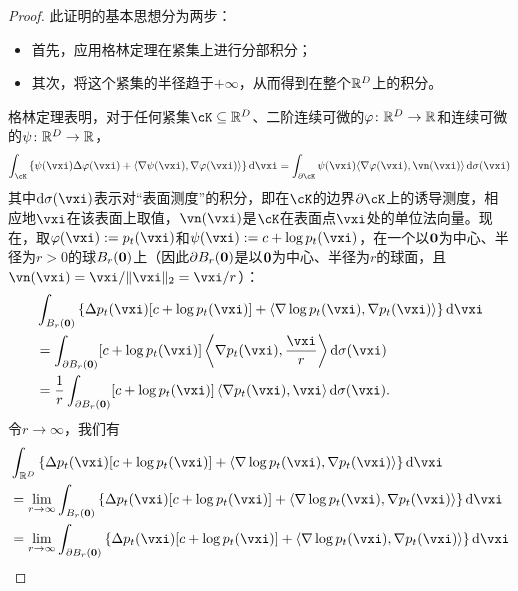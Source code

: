 \documentclass[../../book-main.tex]{subfiles}
\begin{document}
\begin{proof}
    此证明的基本思想分为两步：
    \begin{itemize}
        \item 首先，应用格林定理在紧集上进行分部积分；
        \item 其次，将这个紧集的半径趋于\(+\infty\)，从而得到在整个\(\mathbb{R}^{D}\)上的积分。
    \end{itemize}
    格林定理表明，对于任何紧集\(\cK \subseteq \R^{D}\)、二阶连续可微的\(\plainphi \colon \R^{D} \to \R\)和连续可微的\(\psi \colon \mathbb{R}^{D} \to \mathbb{R}\)，
    \begin{equation}
        \int_{\cK}\bc{\psi(\vxi) \Delta \plainphi(\vxi) + \ip{\nabla \psi(\vxi)}{\nabla \plainphi(\vxi)}}\odif{\vxi} = \int_{\partial \cK}\psi(\vxi)\ip{\nabla \plainphi(\vxi)}{\vn(\vxi)}\odif{\sigma(\vxi)}
    \end{equation}
    其中\(\odif{\sigma(\vxi)}\)表示对“表面测度”的积分，即在\(\cK\)的边界\(\partial \cK\)上的诱导测度，相应地\(\vxi\)在该表面上取值，\(\vn(\vxi)\)是\(\cK\)在表面点\(\vxi\)处的单位法向量。现在，取\(\plainphi(\vxi) := p_{t}(\vxi)\)和\(\psi(\vxi) := c + \log p_{t}(\vxi)\)，在一个以\(\bm{0}\)为中心、半径为\(r > 0\)的球\(B_{r}(\bm{0})\)上（因此\(\partial B_{r}(\bm{0})\)是以\(\bm{0}\)为中心、半径为\(r\)的球面，且\(\vn(\vxi) = \vxi/\norm{\vxi}_{2} = \vxi/r\)）：
    \begin{align}
        &\int_{B_{r}(\vzero)}\bc{\Delta p_{t}(\vxi)[c + \log p_{t}(\vxi)] + \ip{\nabla \log p_{t}(\vxi)}{\nabla p_{t}(\vxi)}}\odif{\vxi} \\
        &= \int_{\partial B_{r}(\vzero)}[c + \log p_{t}(\vxi)]\ip*{\nabla p_{t}(\vxi)}{\frac{\vxi}{r}}\odif{\sigma(\vxi)} \\
        &= \frac{1}{r}\int_{\partial B_{r}(\vzero)}[c + \log p_{t}(\vxi)]\ip*{\nabla p_{t}(\vxi)}{\vxi}\odif{\sigma(\vxi)}.
    \end{align}
    令\(r \to \infty\)，我们有
    \begin{align}
        &\int_{\R^{D}}\bc{\Delta p_{t}(\vxi)[c + \log p_{t}(\vxi)] + \ip{\nabla \log p_{t}(\vxi)}{\nabla p_{t}(\vxi)}}\odif{\vxi} \label{eq:app_diffusion_r_infinity_limit} \\
        &= \lim_{r \to \infty}\int_{B_{r}(\vzero)}\bc{\Delta p_{t}(\vxi)[c + \log p_{t}(\vxi)] + \ip{\nabla \log p_{t}(\vxi)}{\nabla p_{t}(\vxi)}}\odif{\vxi} \\
        &= \lim_{r \to \infty}\int_{\partial B_{r}(\vzero)}\bc{\Delta p_{t}(\vxi)[c + \log p_{t}(\vxi)] + \ip{\nabla \log p_{t}(\vxi)}{\nabla p_{t}(\vxi)}}\odif{\vxi} \\ 

\end{align}
\end{proof}
\end{document}

